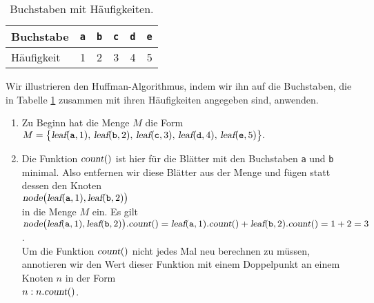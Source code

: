 \begin{table}[htbp]
  \centering
\begin{tabular}[t]{|l|r|r|r|r|r|}
\hline
Buchstabe  & \texttt{a} & \texttt{b} & \texttt{c} & \texttt{d} & \texttt{e} \\
\hline
H\"aufigkeit &          1 &          2 &          3 &          4 &          5 \\
\hline
\end{tabular}
  \caption{Buchstaben mit H\"aufigkeiten.}
  \label{tab:frequency}
\end{table}

Wir illustrieren den  Huffman-Algorithmus, indem wir ihn auf die Buchstaben, die in
Tabelle \ref{tab:frequency} zusammen mit ihren H\"aufigkeiten angegeben sind, anwenden.
\begin{enumerate}
\item Zu Beginn hat die Menge $M$ die Form
      \\[0.2cm]
      \hspace*{1.3cm}
      $ M = \bigl\{ \textsl{leaf}(\mathtt{a},1),\,
             \textsl{leaf}(\mathtt{b},2),\, 
             \textsl{leaf}(\mathtt{c},3),\,
             \textsl{leaf}(\mathtt{d},4),\,
             \textsl{leaf}(\mathtt{e},5)\bigr\}. $
\item Die Funktion $\textsl{count}()$ ist hier f\"ur die Bl\"atter mit den Buchstaben \texttt{a} und
      \texttt{b} minimal.  Also entfernen wir diese Bl\"atter aus der Menge und f\"ugen statt
      dessen den Knoten 
      \\[0.2cm]
      \hspace*{1.3cm}
      $\textsl{node}\bigl(\textsl{leaf}(\mathtt{a},1), \textsl{leaf}(\mathtt{b},2)\bigr)$
      \\[0.2cm]
      in die Menge $M$ ein.  Es gilt
      \\[0.2cm]
      \hspace*{0.3cm}
      $\textsl{node}\bigl(\textsl{leaf}(\mathtt{a},1), \textsl{leaf}(\mathtt{b},2)\bigr).\textsl{count}()
       = \textsl{leaf}(\mathtt{a},1).\textsl{count}()+  \textsl{leaf}(\mathtt{b},2).\textsl{count}()
       = 1 + 2 = 3$.
      \\[0.2cm]
      Um die Funktion $\textsl{count}()$ nicht jedes Mal neu berechnen zu m\"ussen, annotieren wir
      den Wert dieser Funktion mit einem Doppelpunkt an einem Knoten $n$ in der Form 
      \\[0.2cm]
      \hspace*{1.3cm}
      $n:n.\textsl{count}()$.
      \\[0.2cm]

\end{enumerate}
